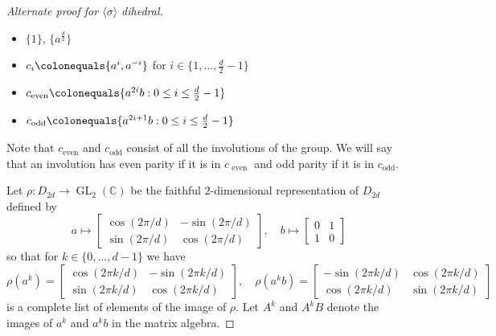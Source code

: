 \documentclass{dcthesis}
\newcommand{\CC}{\mathbb C}
\newcommand{\defi}[1]{\textsf{#1}}
\DeclareMathOperator{\GL}{GL}
\numberwithin{equation}{section}
\theoremstyle{definition}
\theoremstyle{remark}
\begin{document}
{{\begin{proof}[Alternate proof for $\langle\sigma\rangle$ dihedral]
\begin{itemize}
        \item
          $ \{1\} $,
          $ \{a^{\frac{d}{2}}\} $
        \item
          $c_i\colonequals \{a^i,a^{-i}\}$
          for $i\in \{1,\dots,\frac{d}{2}-1\}$
        \item
          $c_\text{even}
          \colonequals
          \{a^{2i}b : 0\leq i\leq \frac{d}{2}-1\}$
        \item
          $c_\text{odd}
          \colonequals
          \{a^{2i+1}b : 0\leq i\leq \frac{d}{2}-1\}$
      \end{itemize}
      Note that $c_\text{even}$ and $c_\text{odd}$
      consist of all the involutions of the group.
      We will say that an involution has
      \defi{even parity}
      if it is in $c_\text{ even }$
      and \defi{odd parity}
      if it is in $c_\text{odd}$.
      \par
      Let $\rho\colon D_{2d}\to\GL_2(\CC)$ be the
      faithful $2$-dimensional representation
      of $D_{2d}$ defined by
      \begin{equation}
        \label{eqn:dihedralrepresentation}
        a\mapsto
        \begin{bmatrix}
          \cos(2\pi/d)&-\sin(2\pi/d)\\
          \sin(2\pi/d)&\cos(2\pi/d)
        \end{bmatrix},\quad
        b\mapsto
        \begin{bmatrix}
          0&1\\
          1&0
        \end{bmatrix}
      \end{equation}
      so that for $k\in \{0,\dots,d-1\}$
      we have
      \begin{equation}
        \label{eqn:dihedralelts}
        \rho(a^k)=
        \begin{bmatrix}
          \cos(2\pi k/d)&-\sin(2\pi k/d)\\
          \sin(2\pi k/d)&\cos(2\pi k/d)
        \end{bmatrix},\quad
        \rho(a^kb)=
        \begin{bmatrix}
          -\sin(2\pi k/d)&\cos(2\pi k/d)\\
          \cos(2\pi k/d)&\sin(2\pi k/d)
        \end{bmatrix}
      \end{equation}
      is a complete list of elements of
      the image of $\rho$.
      Let $A^k$ and $A^kB$ denote the images
      of $a^k$ and $a^kb$ in the matrix algebra.

\end{proof}}}
\end{document}
